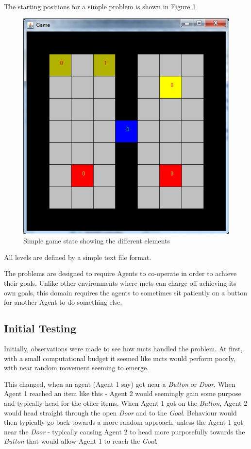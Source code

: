 \documentclass{IEEEtran}
\begin{document}
The starting positions for a simple problem is shown in Figure \ref{InitialState}
\begin{figure}[ht]
\centering
\includegraphics[scale=0.5]{InitialState}
\caption{Simple game state showing the different elements\protect\footnotemark }
\label{InitialState}
\end{figure}

All levels are defined by a simple text file format.

The problems are designed to require Agents to co-operate in order to achieve their goals. Unlike other environments where \gls{mcts} can charge off achieving its own goals, this domain requires the agents to sometimes sit patiently on a button for another Agent to do something else.

\subsection{Initial Testing}
Initially, observations were made to see how \gls{mcts} handled the problem. At first, with a small computational budget it seemed like \gls{mcts} would perform poorly, with near random movement seeming to emerge.

This changed, when an agent (Agent 1 say) got near a \emph{Button} or \emph{Door}. When Agent 1 reached an item like this - Agent 2 would seemingly gain some purpose and typically head for the other items. When Agent 1 got on the \emph{Button}, Agent 2 would head straight through the open \emph{Door} and to the \emph{Goal}. Behaviour would then typically go back towards a more random approach, unless the Agent 1 got near the \emph{Door} - typically causing Agent 2 to head more purposefully towards the \emph{Button} that would allow Agent 1 to reach the \emph{Goal}.
\end{document}
